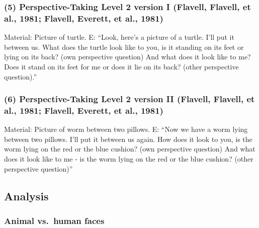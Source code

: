 \documentclass[
  man,mask,floatsintext]{apa7}
\begin{document}
\hypertarget{perspective-taking-level-2-version-i-flavell1981development-flavell1981younga}{%
\subsubsection{(5) Perspective-Taking Level 2 version I (Flavell, Flavell, et al., 1981; Flavell, Everett, et al., 1981)}\label{perspective-taking-level-2-version-i-flavell1981development-flavell1981younga}}

Material: Picture of turtle.
E: ``Look, here's a picture of a turtle. I'll put it between us. What does the turtle look like to you, is it standing on its feet or lying on its back? (own perspective question) And what does it look like to me? Does it stand on its feet for me or does it lie on its back? (other perspective question).''

\hypertarget{perspective-taking-level-2-version-ii-flavell1981development-flavell1981younga}{%
\subsubsection{(6) Perspective-Taking Level 2 version II (Flavell, Flavell, et al., 1981; Flavell, Everett, et al., 1981)}\label{perspective-taking-level-2-version-ii-flavell1981development-flavell1981younga}}

Material: Picture of worm between two pillows.
E: ``Now we have a worm lying between two pillows. I'll put it between us again. How does it look to you, is the worm lying on the red or the blue cushion? (own perspective question) And what does it look like to me - is the worm lying on the red or the blue cushion? (other perspective question)''

\hypertarget{analysis-2}{%
\subsection{Analysis}\label{analysis-2}}

\hypertarget{animal-vs.-human-faces}{%
\subsubsection{Animal vs.~human faces}\label{animal-vs.-human-faces}}
\end{document}
